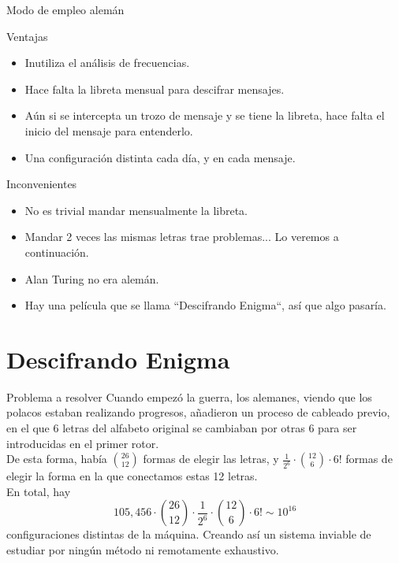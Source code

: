 \documentclass[aspectratio=169]{beamer}
\begin{document}
\begin{frame}{Modo de empleo alemán}
\begin{block}{Ventajas}
\begin{itemize}
     \pause \item Inutiliza el análisis de frecuencias.
     \pause \item Hace falta la libreta mensual para descifrar mensajes.
     \pause \item Aún si se intercepta un trozo de mensaje y se tiene la libreta, hace falta el inicio del mensaje para entenderlo.
     \pause \item Una configuración distinta cada día, y en cada mensaje.
\end{itemize}
\end{block}
\begin{block}{Inconvenientes}
\begin{itemize} 
     \pause \item No es trivial mandar mensualmente la libreta.
     \pause \item Mandar 2 veces las mismas letras trae problemas... Lo veremos a continuación.
     \pause \item Alan Turing no era alemán.
     \pause \item Hay una película que se llama ``Descifrando Enigma``, así que algo pasaría.
\end{itemize}
\end{block}


\end{frame}



\section{Descifrando Enigma}
\begin{frame}{Problema a resolver}
Cuando empezó la guerra, los alemanes, viendo que los polacos estaban realizando progresos, añadieron un proceso de cableado previo, en el que 6 letras del alfabeto original se cambiaban por otras 6 para ser introducidas en el primer rotor.\pause \\  
De esta forma, había $\binom{26}{12}$ formas de elegir las letras, y $\frac{1}{2^6} \cdot \binom{12}{6} \cdot 6!$ formas de elegir la forma en la que conectamos estas 12 letras.\pause \\  

En total, hay 
$$105,456 \cdot \binom{26}{12} \cdot \frac{1}{2^6} \cdot \binom{12}{6} \cdot 6! \sim 10^{16}$$
configuraciones distintas de la máquina. Creando así un sistema inviable de estudiar por ningún método ni remotamente exhaustivo.

\end{frame}
\end{document}
